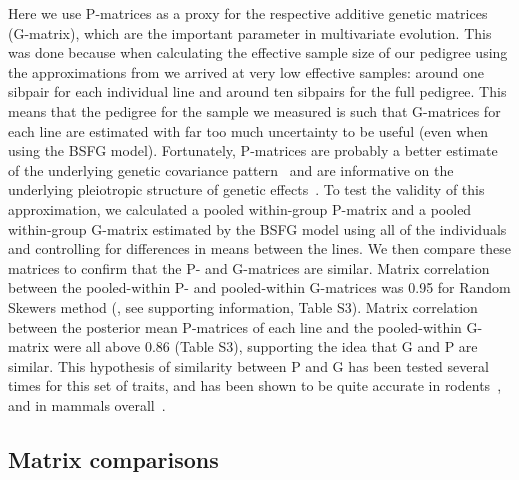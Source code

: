 \begin{refsection}
Here we use P-matrices as a proxy for the respective additive genetic
matrices (G-matrix), which are the important parameter in multivariate
evolution. This was done because when calculating the effective sample
size of our pedigree using the approximations from \textcite{Raffa2016-uh} we arrived
at very low effective samples: around one sibpair for each individual
line and around ten sibpairs for the full pedigree. This means that the
pedigree for the sample we measured is such that G-matrices for each
line are estimated with far too much uncertainty to be useful (even when
using the BSFG model). Fortunately, P-matrices are probably a better
estimate of the underlying genetic covariance
pattern~\parencite{Roff1995-ws, Marroig2012-jd} and are informative on the
underlying pleiotropic structure of genetic
effects~\parencite{Kenney-Hunt2008-bd, Porto2016-qc}. To test the validity of this
approximation, we calculated a pooled within-group P-matrix and a pooled
within-group G-matrix estimated by the BSFG model using all of the
individuals and controlling for differences in means between the lines.
We then compare these matrices to confirm that the P- and G-matrices are
similar. Matrix correlation between the pooled-within P- and
pooled-within G-matrices was 0.95 for Random Skewers method
(\textcite{Cheverud2007-yp}, see supporting information, Table S3). Matrix
correlation between the posterior mean P-matrices of each line and the
pooled-within G-matrix were all above 0.86 (Table S3), supporting the
idea that G and P are similar. This hypothesis of similarity between P
and G has been tested several times for this set of traits, and has been
shown to be quite accurate in rodents~\parencite{Garcia2014-oj}, and in mammals
overall~\parencite{Cheverud1988-he, Porto2009-pi, Porto2016-qc, Marroig2010-be, Hubbe2016-za, Porto2015-zv}.

\subsection{Matrix comparisons}


\end{refsection}
